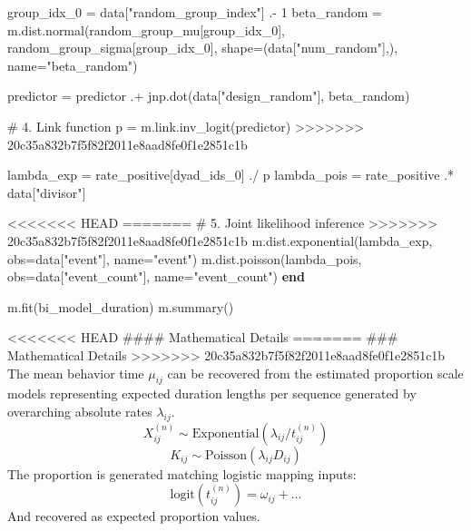 \documentclass[
  letterpaper,
  DIV=11,
  numbers=noendperiod]{scrartcl}
\newenvironment{Shaded}{\begin{snugshade}}{\end{snugshade}}
\newcommand{\CommentTok}[1]{\textcolor[rgb]{0.37,0.37,0.37}{#1}}
\newcommand{\FloatTok}[1]{\textcolor[rgb]{0.68,0.00,0.00}{#1}}
\newcommand{\FunctionTok}[1]{\textcolor[rgb]{0.28,0.35,0.67}{#1}}
\newcommand{\KeywordTok}[1]{\textcolor[rgb]{0.00,0.23,0.31}{\textbf{#1}}}
\newcommand{\NormalTok}[1]{\textcolor[rgb]{0.00,0.23,0.31}{#1}}
\newcommand{\OperatorTok}[1]{\textcolor[rgb]{0.37,0.37,0.37}{#1}}
\newcommand{\StringTok}[1]{\textcolor[rgb]{0.13,0.47,0.30}{#1}}
\begin{document}
\begin{Shaded}
\begin{Highlighting}[]
\NormalTok{    group\_idx\_0 }\OperatorTok{=}\NormalTok{ data[}\StringTok{"random\_group\_index"}\NormalTok{] }\OperatorTok{.{-}} \FloatTok{1}
\NormalTok{    beta\_random }\OperatorTok{=}\NormalTok{ m.dist.}\FunctionTok{normal}\NormalTok{(random\_group\_mu[group\_idx\_0], random\_group\_sigma[group\_idx\_0], shape}\OperatorTok{=}\NormalTok{(data[}\StringTok{"num\_random"}\NormalTok{],), name}\OperatorTok{=}\StringTok{"beta\_random"}\NormalTok{)}
    
\NormalTok{    predictor }\OperatorTok{=}\NormalTok{ predictor }\OperatorTok{.+}\NormalTok{ jnp.}\FunctionTok{dot}\NormalTok{(data[}\StringTok{"design\_random"}\NormalTok{], beta\_random)}

    \CommentTok{\# 4. Link function}
\NormalTok{    p }\OperatorTok{=}\NormalTok{ m.link.}\FunctionTok{inv\_logit}\NormalTok{(predictor)}
\OperatorTok{\textgreater{}\textgreater{}\textgreater{}\textgreater{}\textgreater{}\textgreater{}\textgreater{}} \FloatTok{20}\NormalTok{c35a832b7f5f82f2011e8aad8fe0f1e2851c1b}
    
\NormalTok{    lambda\_exp }\OperatorTok{=}\NormalTok{ rate\_positive[dyad\_ids\_0] }\OperatorTok{./}\NormalTok{ p}
\NormalTok{    lambda\_pois }\OperatorTok{=}\NormalTok{ rate\_positive }\OperatorTok{.*}\NormalTok{ data[}\StringTok{"divisor"}\NormalTok{]}
    
\OperatorTok{\textless{}\textless{}\textless{}\textless{}\textless{}\textless{}\textless{}}\NormalTok{ HEAD}
\OperatorTok{=======}
    \CommentTok{\# 5. Joint likelihood inference}
\OperatorTok{\textgreater{}\textgreater{}\textgreater{}\textgreater{}\textgreater{}\textgreater{}\textgreater{}} \FloatTok{20}\NormalTok{c35a832b7f5f82f2011e8aad8fe0f1e2851c1b}
\NormalTok{    m.dist.}\FunctionTok{exponential}\NormalTok{(lambda\_exp, obs}\OperatorTok{=}\NormalTok{data[}\StringTok{"event"}\NormalTok{], name}\OperatorTok{=}\StringTok{"event"}\NormalTok{)}
\NormalTok{    m.dist.}\FunctionTok{poisson}\NormalTok{(lambda\_pois, obs}\OperatorTok{=}\NormalTok{data[}\StringTok{"event\_count"}\NormalTok{], name}\OperatorTok{=}\StringTok{"event\_count"}\NormalTok{)}
\KeywordTok{end}

\NormalTok{m.}\FunctionTok{fit}\NormalTok{(bi\_model\_duration)}
\NormalTok{m.}\FunctionTok{summary}\NormalTok{()}
\end{Highlighting}
\end{Shaded}

\textless\textless\textless\textless\textless\textless\textless{} HEAD
\#\#\#\# Mathematical Details ======= \#\#\# Mathematical Details
\textgreater\textgreater\textgreater\textgreater\textgreater\textgreater\textgreater{}
20c35a832b7f5f82f2011e8aad8fe0f1e2851c1b The mean behavior time
\(\mu_{ij}\) can be recovered from the estimated proportion scale models
representing expected duration lengths per sequence generated by
overarching absolute rates \(\lambda_{ij}\). \[
X_{ij}^{(n)} \sim \text{Exponential}(\lambda_{ij} / t_{ij}^{(n)}) 
\] \[
K_{ij} \sim \text{Poisson}(\lambda_{ij} D_{ij})
\] The proportion is generated matching logistic mapping inputs: \[
\text{logit}(t_{ij}^{(n)}) = \omega_{ij} + \dots 
\] And recovered as expected proportion values.
\end{document}
